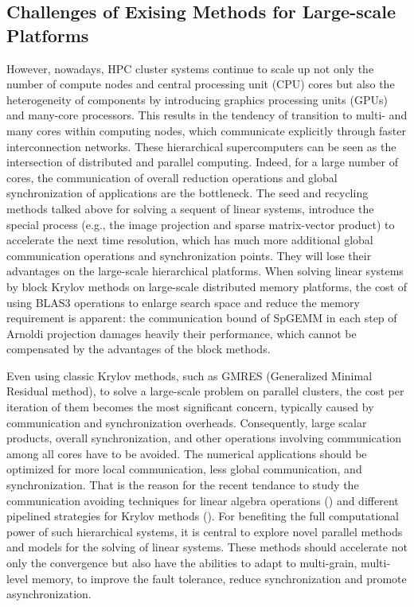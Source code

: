 \subsection{Challenges of Exising Methods for Large-scale Platforms}

However, nowadays, HPC cluster systems continue to scale up not only the number of compute nodes and central processing unit (CPU) cores but also the heterogeneity of components by introducing graphics processing units (GPUs) and many-core processors. This results in the tendency of transition to multi- and many cores within computing nodes, which communicate explicitly through faster interconnection networks. These hierarchical supercomputers can be seen as the intersection of distributed and parallel computing. Indeed, for a large number of cores, the communication of overall reduction operations and global synchronization of applications are the bottleneck. The seed and recycling methods talked above for solving a sequent of linear systems, introduce the special process (e.g., the image projection and sparse matrix-vector product) to accelerate the next time resolution, which has much more additional global communication operations and synchronization points. They will lose their advantages on the large-scale hierarchical platforms. When solving linear systems by block Krylov methods on large-scale distributed memory platforms, the cost of using BLAS3 operations to enlarge search space and reduce the memory requirement is apparent: the communication bound of SpGEMM in each step of Arnoldi projection damages heavily their performance, which cannot be compensated by the advantages of the block methods.

Even using classic Krylov methods, such as GMRES (Generalized Minimal Residual method), to solve a large-scale problem on parallel clusters, the cost per iteration of them becomes the most significant concern, typically caused by communication and synchronization overheads. Consequently, large scalar products, overall synchronization, and other operations involving communication among all cores have to be avoided. The numerical applications should be optimized for more local communication, less global communication, and synchronization. That is the reason for the recent tendance to study the communication avoiding techniques for linear algebra operations (\cite{demmel2008avoiding, hoemmen2010communication, carson2015communication}) and different pipelined strategies for Krylov methods (\cite{ghysels2013hiding, morgan2016stochastic, cools2017communication}). For benefiting the full computational power of such hierarchical systems, it is central to explore novel parallel methods and models for the solving of linear systems. These methods should accelerate not only the convergence but also have the abilities to adapt to multi-grain, multi-level memory, to improve the fault tolerance, reduce synchronization and promote asynchronization.


